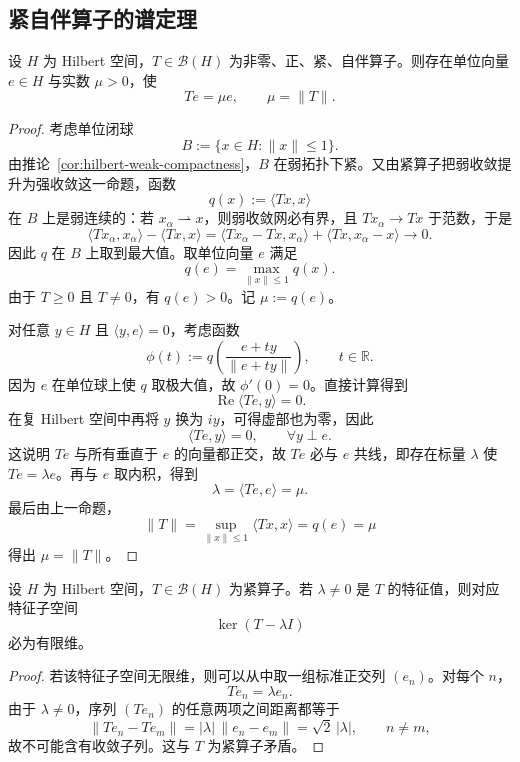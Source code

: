 \subsection{紧自伴算子的谱定理}

\begin{lemma}[正紧自伴算子的主特征值]
设 $H$ 为 Hilbert 空间，$T\in \mathcal B(H)$ 为非零、正、紧、自伴算子。则存在单位向量 $e\in H$ 与实数 $\mu>0$，使
\[
Te=\mu e,
\qquad
\mu=\|T\|.
\]
\end{lemma}

\begin{proof}
考虑单位闭球
\[
B:=\{x\in H:\|x\|\le 1\}.
\]
由推论~\ref{cor:hilbert-weak-compactness}，$B$ 在弱拓扑下紧。又由紧算子把弱收敛提升为强收敛这一命题，函数
\[
q(x):=\langle Tx,x\rangle
\]
在 $B$ 上是弱连续的：若 $x_\alpha\rightharpoonup x$，则弱收敛网必有界，且 $Tx_\alpha\to Tx$ 于范数，于是
\[
\langle Tx_\alpha,x_\alpha\rangle-\langle Tx,x\rangle
=\langle Tx_\alpha-Tx,x_\alpha\rangle+\langle Tx,x_\alpha-x\rangle\to 0.
\]
因此 $q$ 在 $B$ 上取到最大值。取单位向量 $e$ 满足
\[
q(e)=\max_{\|x\|\le 1} q(x).
\]
由于 $T\ge 0$ 且 $T\neq 0$，有 $q(e)>0$。记 $\mu:=q(e)$。

对任意 $y\in H$ 且 $\langle y,e\rangle=0$，考虑函数
\[
\phi(t):=q\!\left(\frac{e+ty}{\|e+ty\|}\right),\qquad t\in \mathbb R.
\]
因为 $e$ 在单位球上使 $q$ 取极大值，故 $\phi'(0)=0$。直接计算得到
\[
\operatorname{Re}\langle Te,y\rangle=0.
\]
在复 Hilbert 空间中再将 $y$ 换为 $iy$，可得虚部也为零，因此
\[
\langle Te,y\rangle=0,\qquad \forall y\perp e.
\]
这说明 $Te$ 与所有垂直于 $e$ 的向量都正交，故 $Te$ 必与 $e$ 共线，即存在标量 $\lambda$ 使 $Te=\lambda e$。再与 $e$ 取内积，得到
\[
\lambda=\langle Te,e\rangle=\mu.
\]
最后由上一命题，
\[
\|T\|
=\sup_{\|x\|\le 1}\langle Tx,x\rangle
=q(e)=\mu
\]
得出 $\mu=\|T\|$。
\end{proof}

\begin{proposition}[紧算子的非零特征值只能有限重]
设 $H$ 为 Hilbert 空间，$T\in \mathcal B(H)$ 为紧算子。若 $\lambda\neq 0$ 是 $T$ 的特征值，则对应特征子空间
\[
\ker(T-\lambda I)
\]
必为有限维。
\end{proposition}

\begin{proof}
若该特征子空间无限维，则可以从中取一组标准正交列 $(e_n)$。对每个 $n$，
\[
Te_n=\lambda e_n.
\]
由于 $\lambda\neq 0$，序列 $(Te_n)$ 的任意两项之间距离都等于
\[
\|Te_n-Te_m\|=|\lambda|\,\|e_n-e_m\|=\sqrt{2}\,|\lambda|,\qquad n\neq m,
\]
故不可能含有收敛子列。这与 $T$ 为紧算子矛盾。
\end{proof}

